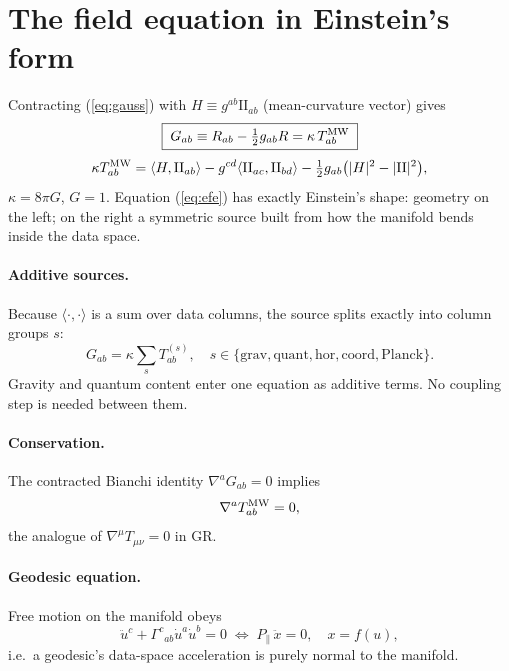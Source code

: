 \documentclass[10pt,twocolumn]{article}
\begin{document}
\section{The field equation in Einstein's form}
Contracting (\ref{eq:gauss}) with $H\equiv g^{ab}\mathrm{II}_{ab}$ (mean-curvature vector) gives
\begin{equation}
\boxed{\;G_{ab}\equiv R_{ab}-\tfrac12 g_{ab}R=\kappa\,T^{\rm MW}_{ab}\;}
\label{eq:efe}
\end{equation}
\begin{equation}
\kappa T^{\rm MW}_{ab}=\langle H,\mathrm{II}_{ab}\rangle-g^{cd}\langle\mathrm{II}_{ac},\mathrm{II}_{bd}\rangle
-\tfrac12 g_{ab}\bigl(|H|^2-|\mathrm{II}|^2\bigr),
\label{eq:T}
\end{equation}
$\kappa=8\pi G$, $G=1$. Equation (\ref{eq:efe}) has exactly Einstein's shape: geometry on the left;
on the right a symmetric source built from how the manifold bends inside the data space.

\paragraph{Additive sources.} Because $\langle\cdot,\cdot\rangle$ is a sum over data columns, the
source splits exactly into column groups $s$:
\begin{equation}
G_{ab}=\kappa\sum_{s}T^{(s)}_{ab},\quad s\in\{\text{grav},\text{quant},\text{hor},\text{coord},\text{Planck}\}.
\label{eq:split}
\end{equation}
Gravity and quantum content enter one equation as additive terms. No coupling step is needed
between them.

\paragraph{Conservation.} The contracted Bianchi identity $\nabla^aG_{ab}=0$ implies
\begin{equation}
\nabla^aT^{\rm MW}_{ab}=0,
\label{eq:cons}
\end{equation}
the analogue of $\nabla^\mu T_{\mu\nu}=0$ in GR.

\paragraph{Geodesic equation.} Free motion on the manifold obeys
\begin{equation}
\ddot u^{c}+\Gamma^{c}{}_{ab}\dot u^{a}\dot u^{b}=0
\;\Longleftrightarrow\; P_{\parallel}\,\ddot{x}=0,\quad x=f(u),
\label{eq:geo}
\end{equation}
i.e.\ a geodesic's data-space acceleration is purely normal to the manifold.
\end{document}
